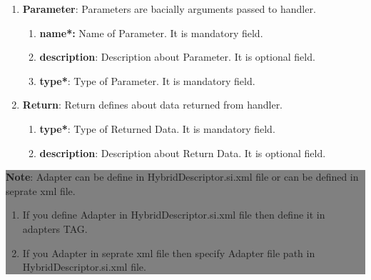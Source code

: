 \begin{enumerate}
\begin{enumerate}
\begin{enumerate}
				\end{enumerate}

				
				\begin{enumerate}

					\item \small \textbf{Parameter}: Parameters are bacially arguments passed to handler.


						\begin{enumerate}
	
							\item \small \textbf{name*:} Name of Parameter. It is mandatory field.
							\item \small \textbf{description}: Description about Parameter. It is optional field.
							\item \small \textbf{type*}: Type of Parameter. It is mandatory field.			
		
						\end{enumerate}	
	
				
					\item \small \textbf{Return}: Return defines about data returned from handler.

						\begin{enumerate}

							\item \small \textbf{type*}: Type of Returned Data. It is mandatory field.
							\item \small \textbf{description}: Description about Return Data. It is optional field.
			
						\end{enumerate}

				\end{enumerate}


			\begin{center}
				\colorbox{grey}{
					\parbox[t]{.8\linewidth}{
						\fontsize{11pt}{11pt}\selectfont %
						\vspace*{0.1cm} %
		
						\hfill \textbf{Note}: Adapter can be define in HybridDescriptor.si.xml file or can be defined in seprate xml file.\\

						\hfill 	
						\begin{enumerate}
			
							\item \small If you define Adapter in HybridDescriptor.si.xml file then define it in adapters TAG.
							\item \small If you Adapter in seprate xml file then specify Adapter file path in HybridDescriptor.si.xml file.


\end{enumerate}}}
\end{center}
\end{enumerate}
\end{enumerate}
